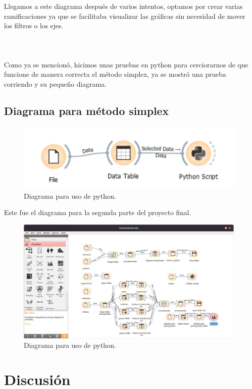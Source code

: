 \documentclass{article}
\begin{document}
 Llegamos a este diagrama después de varios intentos, optamos por crear varias ramificaciones ya que se facilitaba visualizar las gráficas sin necesidad de mover los filtros o los ejes.  \\\\ \\ \\  
 Como ya se mencionó, hicimos unas pruebas en python para cerciorarnos de que funcione de manera correcta el método simplex, ya se mostró una prueba corriendo y su pequeño diagrama.
\subsection*{Diagrama para método simplex}
 \begin{figure}[htb!]
    \centering
    \includegraphics[width = 11 cm]{python.png}
    \caption{Diagrama para uso de python.}
    \label{diagrama}
\end{figure}
Este fue el diagrama para la segunda parte del proyecto final.
\begin{figure}[htb!]
    \centering
    \includegraphics[width = 16 cm]{imagenes/final.jpeg}
    \caption{Diagrama para uso de python.}
    \label{diagrama}
\end{figure}

 
\newpage 




\newpage

\section*{Discusión}
\end{document}

